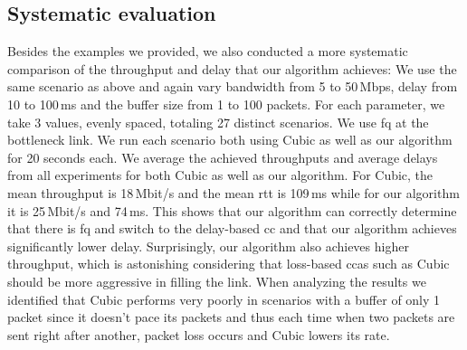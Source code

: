 \documentclass[runningheads]{llncs}
\begin{document}
\subsection{Systematic evaluation}
 
Besides the examples we provided, we also conducted a more systematic comparison of the throughput and delay that our algorithm achieves: We use the same scenario as above and again vary bandwidth from 5 to 50\,Mbps, delay from 10 to 100\,ms and the buffer size from 1 to 100 packets. For each parameter, we take 3 values, evenly spaced, totaling 27 distinct scenarios. We use \gls{fq} at the bottleneck link. We run each scenario both using Cubic as well as our algorithm for 20 seconds each. We average the achieved throughputs and average delays from all experiments for both Cubic as well as our algorithm. For Cubic, the mean throughput is 18\,Mbit/s and the mean \gls{rtt} is 109\,ms while for our algorithm it is 25\,Mbit/s and 74\,ms. This shows that our algorithm can correctly determine that there is \gls{fq} and switch to the delay-based \gls{cc} and that our algorithm achieves significantly lower delay. Surprisingly, our algorithm also achieves higher throughput, which is astonishing considering that loss-based \glspl{cca} such as Cubic should be more aggressive in filling the link. When analyzing the results we identified that Cubic performs very poorly in scenarios with a buffer of only 1 packet since it doesn't pace its packets and thus each time when two packets are sent right after another, packet loss occurs and Cubic lowers its rate. 

\end{document}
